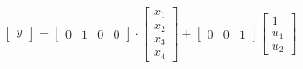 \documentclass[a4paper,12pt]{article}
\begin{document}
\begin{equation*}
    \begin{bmatrix}
        y
    \end{bmatrix}
    =
    \begin{bmatrix}
        0 & 1 & 0 & 0
    \end{bmatrix}
    \cdot
    \begin{bmatrix}
        x_1 \\ x_2 \\ x_3 \\ x_4
    \end{bmatrix}
    +
    \begin{bmatrix}
        0 & 0 & 1
    \end{bmatrix}
    \begin{bmatrix}
        1 \\ u_1 \\ u_2
    \end{bmatrix}
\end{equation*}
\end{document}
